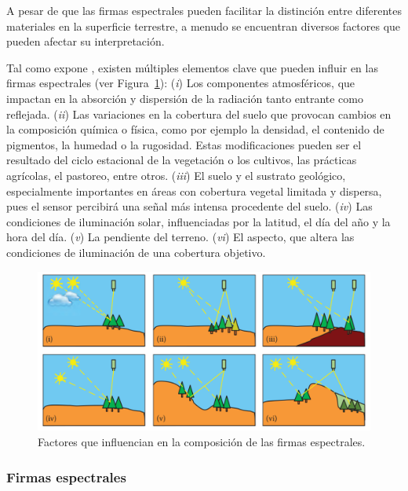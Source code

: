 A pesar de que las firmas espectrales pueden facilitar la distinción entre diferentes materiales en la superficie terrestre, a menudo se encuentran diversos factores que pueden afectar su interpretación.

Tal como expone , existen múltiples elementos clave que pueden influir en las firmas espectrales (ver Figura~\ref{fig:FactorInfluenciaFirmasEspectrales}): (\textit{i}) Los componentes atmosféricos, que impactan en la absorción y dispersión de la radiación tanto entrante como reflejada. (\textit{ii}) Las variaciones en la cobertura del suelo que provocan cambios en la composición química o física, como por ejemplo la densidad, el contenido de pigmentos, la humedad o la rugosidad. Estas modificaciones pueden ser el resultado del ciclo estacional de la vegetación o los cultivos, las prácticas agrícolas, el pastoreo, entre otros. (\textit{iii}) El suelo y el sustrato geológico, especialmente importantes en áreas con cobertura vegetal limitada y dispersa, pues el sensor percibirá una señal más intensa procedente del suelo. (\textit{iv}) Las condiciones de iluminación solar, influenciadas por la latitud, el día del año y la hora del día. (\textit{v}) La pendiente del terreno. (\textit{vi}) El aspecto, que altera las condiciones de iluminación de una cobertura objetivo.

\begin{figure}[H]
    \begin{center}
        \includegraphics[width=1\textwidth]{Images/FactorInfluenciaFirmasEspectrales.png}
    \end{center}
    \caption{Factores que influencian en la composición de las firmas espectrales.}
    \label{fig:FactorInfluenciaFirmasEspectrales}
\end{figure}

\subsubsection{Firmas espectrales}


